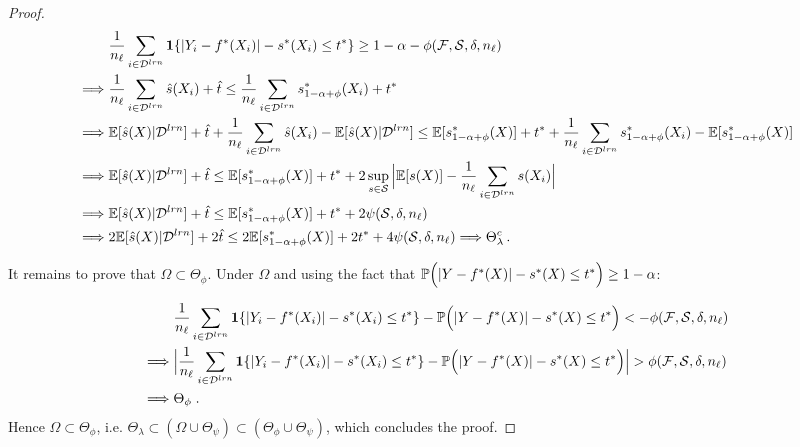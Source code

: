 \begin{proof}
\begin{align*}
    &\frac{1}{n_\ell}\sum_{i\in{\cal D}^{lrn}}\mathbf{1}\{|Y_i-f^*(X_i)| - s^*(X_i)\leq t^* \} \geq 1-\alpha -{\phi(\mathcal{F},{\cal S},\delta,n_\ell)} \\
    \Longrightarrow\hspace{0.1cm} & \frac{1}{n_\ell}\sum_{i\in{\cal D}^{lrn}}\hat{s}(X_i) + \hat{t} \leq \frac{1}{n_\ell}\sum_{i\in{\cal D}^{lrn}}s_{1-\alpha+\phi}^*(X_i) + t^* \\
    \Longrightarrow\hspace{0.1cm} & \mathbb{E}[\hat{s}(X)|{\cal D}^{lrn}]+ \hat{t}+\frac{1}{n_\ell}  \sum_{i\in{\cal D}^{lrn}}\hat{s}(X_i) - \mathbb{E}[\hat{s}(X)|{\cal D}^{lrn}] \leq \mathbb{E}[s_{1-\alpha+\phi}^*(X)] + t^*+ \frac{1}{n_\ell}\sum_{i\in{\cal D}^{lrn}}s_{1-\alpha+\phi}^*(X_i) -  \mathbb{E}[s_{1-\alpha+\phi}^*(X)]\\
    \Longrightarrow\hspace{0.1cm} & \mathbb{E}[\hat{s}(X)|{\cal D}^{lrn}] +\hat{t} \leq \mathbb{E}[s_{1-\alpha+\phi}^*(X)]+ t^* + 2\sup_{s\in{\cal S}}\Big|\mathbb{E}[s(X)] - \frac{1}{n_\ell}\sum_{i\in{\cal D}^{lrn}} s(X_i)\Big| \\
    \Longrightarrow\hspace{0.1cm} & \mathbb{E}[\hat{s}(X)|{\cal D}^{lrn}]  +\hat{t}\leq \mathbb{E}[s_{1-\alpha+\phi}^*(X)] + t^*+ 2{\psi({\cal S},\delta,n_\ell)}\\
    \Longrightarrow\hspace{0.1cm} & 2\mathbb{E}[\hat{s}(X)|{\cal D}^{lrn}] +2\hat{t} \leq 2\mathbb{E}[s_{1-\alpha+\phi}^*(X)] + 2t^*+ 4{\psi({\cal S},\delta,n_\ell)}\Longrightarrow \Theta_\lambda^c \, .
\end{align*}

It remains to prove that $\Omega \subset \Theta_\phi$. Under $\Omega$ and using the fact that ${\mathbb{P}}\Big(|Y-f^*(X)|-s^*(X)\leq t ^*\Big)\geq 1- \alpha$: 

    \begin{align*}
        &\frac{1}{n_\ell}\sum_{i\in{\cal D}^{lrn}}\mathbf{1}\{|Y_i-f^*(X_i)| - s^*(X_i)\leq t^* \} - {\mathbb{P}}\Big(|Y-f^*(X)|-s^*(X)\leq t ^*\Big) < - {\phi(\mathcal{F},{\cal S},\delta,n_\ell)} \\
        \Longrightarrow \hspace{0.1cm}& \Big|\frac{1}{n_\ell}\sum_{i\in{\cal D}^{lrn}}\mathbf{1}\{|Y_i-f^*(X_i)| - s^*(X_i)\leq t^* \} - {\mathbb{P}}\Big(|Y-f^*(X)|-s^*(X)\leq t ^*\Big)\Big| > {\phi(\mathcal{F},{\cal S},\delta,n_\ell)} \\
        \Longrightarrow \hspace{0.1cm}& \Theta_\phi \; .
    \end{align*}
    Hence $\Omega \subset \Theta_\phi$, i.e. $\Theta_\lambda\subset (\Omega \cup \Theta_\psi)\subset (\Theta_\phi \cup \Theta_\psi)$, which concludes the proof.
\end{proof}

